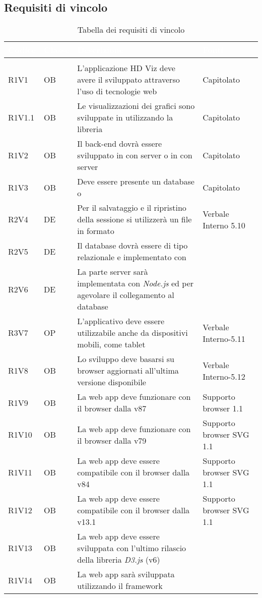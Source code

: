 \subsection{Requisiti di vincolo}
{
\setlength\arrayrulewidth{1pt}
\begin{longtable}{C{2cm} | C{1.5cm} | C{9cm} | C{3.3cm}}
		\textcolor{white}{\textbf{Codice}} & 
		\textcolor{white}{\textbf{Classe}} & 
		\textcolor{white}{\textbf{Descrizione}} & 
		\textcolor{white}{\textbf{Fonti}} \\
		\endfirsthead
	    \\
	    \endfoot
	    \caption{Tabella dei requisiti di vincolo}
	    \endlastfoot

R1V1 & OB & L'applicazione HD Viz deve avere il  sviluppato attraverso l'uso di tecnologie web & Capitolato \\
R1V1.1 & OB & Le visualizzazioni dei grafici sono sviluppate in  utilizzando la libreria  & Capitolato\\
R1V2 & OB & Il back-end dovrà essere sviluppato in  con server  o in  con server  & Capitolato \\
R1V3 & OB & Deve essere presente un database  o  & Capitolato\\
R2V4 & DE & Per il salvataggio e il ripristino della sessione si utilizzerà un file in formato  & Verbale Interno 5.10\\
R2V5 & DE & Il database dovrà essere di tipo relazionale e implementato con \textit{} & \\
R2V6 & DE & La parte server sarà implementata con \textit{Node.js} ed \textit{} per agevolare il collegamento al database &  \\

R3V7 & OP & L'applicativo deve essere utilizzabile anche da dispositivi mobili, come tablet & Verbale Interno-5.11\\
R1V8 & OB & Lo sviluppo deve basarsi su browser aggiornati all'ultima versione disponibile & Verbale Interno-5.12\\
R1V9 & OB & La web app deve funzionare con il browser  dalla v87 & Supporto browser  1.1 \\
R1V10 & OB & La web app deve funzionare con il browser  dalla v79 & Supporto browser SVG 1.1 \\
R1V11 & OB & La web app deve essere compatibile con il browser  dalla v84 & Supporto browser SVG 1.1\\
R1V12 & OB & La web app deve essere compatibile con il browser  dalla v13.1 & Supporto browser SVG 1.1\\
R1V13 & OB & La web app deve essere sviluppata con l'ultimo rilascio della libreria \textit{D3.js} (v6) & \\
R1V14 & OB & La web app sarà sviluppata utilizzando il framework \textit{} & \\

\end{longtable}
}